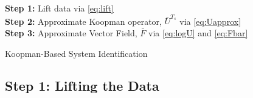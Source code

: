 \begin{algorithm}
\SetAlgoLined
{}
\textbf{Step 1:} Lift data via \eqref{eq:lift} \\
\textbf{Step 2:} Approximate Koopman operator, $\bar{U}^{T_s}$ via \eqref{eq:Uapprox} \\
\textbf{Step 3:} Approximate Vector Field, $\bar{F}$ via \eqref{eq:logU} and \eqref{eq:Fbar} \\
\KwOut{$\bar{\Fv}$}
 \caption{Koopman-Based System Identification}
 \label{alg:sysid}
\end{algorithm}


\subsection{Step 1: Lifting the Data}   \label{sec:step1}

